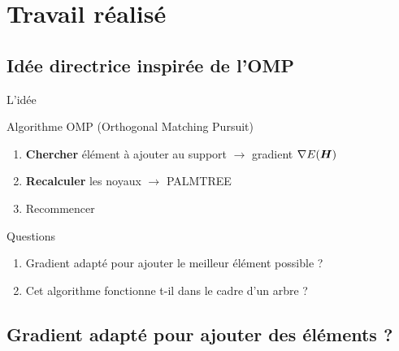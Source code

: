 \section{Travail réalisé}

\subsection{Idée directrice inspirée de l'OMP}
\begin{frame}{L'idée}
\begin{block}{Algorithme OMP (Orthogonal Matching Pursuit)}
	\begin{enumerate}
		\item \textbf{Chercher} élément à ajouter au support $\rightarrow$ \alert{gradient $\nabla E(\bm{H})$}
		\item \textbf{Recalculer} les noyaux $\rightarrow$ \alert{PALMTREE}
		\item Recommencer
	\end{enumerate}
\end{block}
\begin{exampleblock}{Questions}
\begin{enumerate}
	\item Gradient adapté pour ajouter le meilleur élément possible ?
	\item Cet algorithme fonctionne t-il dans le cadre d'un arbre ?
\end{enumerate}
\end{exampleblock}
\end{frame}


\subsection{Gradient adapté pour ajouter des éléments ?}

